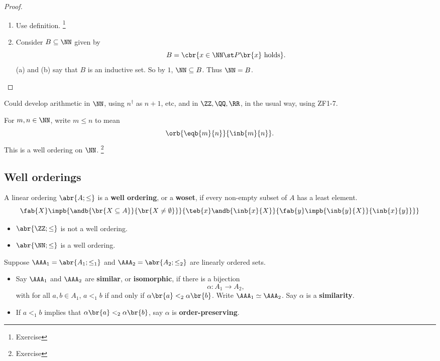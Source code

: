 \pagebreak

\begin{proof}
\hfill
\begin{enumerate}
\item Use definition. \footnote{Exercise}
\item Consider $ B \subseteq \NN $ given by
$$ B = \cbr{x \in \NN \st P\br{x} \ \text{holds}}. $$
(a) and (b) say that $ B $ is an inductive set. So by $ 1 $, $ \NN \subseteq B $. Thus $ \NN = B $.
\end{enumerate}
\end{proof}

Could develop arithmetic in $ \NN $, using $ n^\dagger $ as $ n + 1 $, etc, and in $ \ZZ, \QQ, \RR $, in the usual way, using ZF1-7.

\begin{example*}
For $ m, n \in \NN $, write $ m \le n $ to mean
$$ \orb{\eqb{m}{n}}{\inb{m}{n}}. $$
This is a well ordering on $ \NN $. \footnote{Exercise}
\end{example*}

\subsection{Well orderings}

\begin{definition}
A linear ordering $ \abr{A; \le} $ is a \textbf{well ordering}, or a \textbf{woset}, if every non-empty subset of $ A $ has a least element.
$$ \fab{X}\impb{\andb{\br{X \subseteq A}}{\br{X \ne \emptyset}}}{\teb{x}\andb{\inb{x}{X}}{\fab{y}\impb{\inb{y}{X}}{\inb{x}{y}}}} $$
\end{definition}

\begin{example*}
\hfill
\begin{itemize}
\item $ \abr{\ZZ; \le} $ is not a well ordering.
\item $ \abr{\NN; \le} $ is a well ordering.
\end{itemize}
\end{example*}


Suppose $ \AAA_1 = \abr{A_1; \le_1} $ and $ \AAA_2 = \abr{A_2; \le_2} $ are linearly ordered sets.

\begin{definition}
\hfill
\begin{itemize}
\item Say $ \AAA_1 $ and $ \AAA_2 $ are \textbf{similar}, or \textbf{isomorphic}, if there is a bijection
$$ \alpha : A_1 \to A_2, $$
with for all $ a, b \in A_1 $, $ a <_1 b $ if and only if $ \alpha\br{a} <_2 \alpha\br{b} $. Write $ \AAA_1 \simeq \AAA_2 $. Say $ \alpha $ is a \textbf{similarity}.
\item If $ a <_1 b $ implies that $ \alpha\br{a} <_2 \alpha\br{b} $, say $ \alpha $ is \textbf{order-preserving}.
\end{itemize}
\end{definition}


